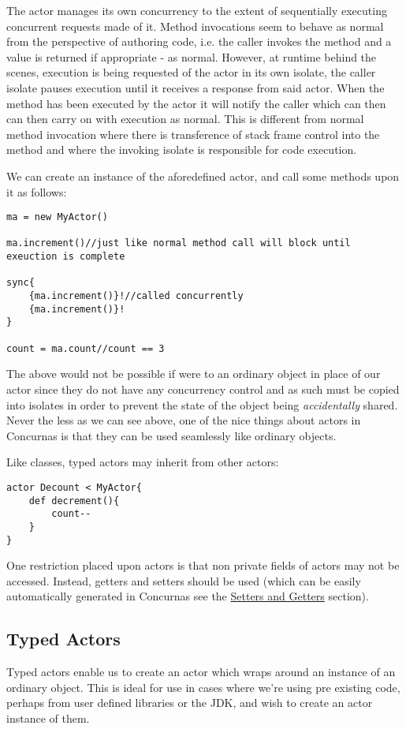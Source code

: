 \documentclass[conc-doc]{subfiles}
\begin{document}
The actor manages its own concurrency to the extent of sequentially executing concurrent requests made of it. Method invocations seem to behave as normal from the perspective of authoring code, i.e. the caller invokes the method and a value is returned if appropriate - as normal. However, at runtime behind the scenes, execution is being requested of the actor in its own isolate, the caller isolate pauses execution until it receives a response from said actor. When the method has been executed by the actor it will notify the caller which can then can then carry on with execution as normal. This is different from normal method invocation where there is transference of stack frame control into the method and where the invoking isolate is responsible for code execution.

We can create an instance of the aforedefined actor, and call some methods upon it as follows:

\begin{lstlisting}
ma = new MyActor()

ma.increment()//just like normal method call will block until exeuction is complete

sync{
	{ma.increment()}!//called concurrently
	{ma.increment()}!
}

count = ma.count//count == 3
\end{lstlisting}

The above would not be possible if were to an ordinary object in place of our actor since they do not have any concurrency control and as such must be copied into isolates in order to prevent the state of the object being \textit{accidentally} shared. Never the less as we can see above, one of the nice things about actors in Concurnas is that they can be used seamlessly like ordinary objects. 

Like classes, typed actors may inherit from other actors:

\begin{lstlisting}
actor Decount < MyActor{
	def decrement(){
		count--
	}
}
\end{lstlisting}

One restriction placed upon actors is that non private fields of actors may not be accessed. Instead, getters and setters should be used (which can be easily automatically generated in Concurnas see the \hyperref[sec:setandget]{Setters and Getters} section).

\subsection{Typed Actors}
\label{subsec:typedactors}
Typed actors enable us to create an actor which wraps around an instance of an ordinary object. This is ideal for use in cases where we're using pre existing code, perhaps from user defined libraries or the JDK, and wish to create an actor instance of them.
\end{document}

